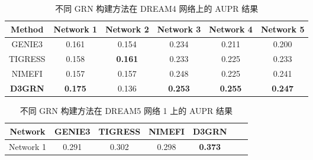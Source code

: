 \begin{table}[!htbp]
  \centering
  \begin{threeparttable}  
  \caption{不同 GRN 构建方法在 DREAM4 网络上的 AUPR 结果}

  \label{tab:performance_dr4} 
    \begin{tabular}{cccccc}  
    \toprule  
    Method
     & Network 1&  Network 2&  Network 3&  Network 4 & Network 5\\
    \midrule  
    GENIE3  &0.161   &0.154           &0.234      &0.211          &0.200                 \\
    TIGRESS &0.158   &\textbf{0.161}           &0.233      &0.225          &0.233                \\
    NIMEFI  &0.157   &0.157           &0.248      &0.225          &0.241                \\
    \textbf{D3GRN}   &\textbf{0.175}  &0.136      &\textbf{0.253} &\textbf{0.255}       &\textbf{0.247}  \\
    \bottomrule  
    \end{tabular}  
   \end{threeparttable}
\end{table} 

\begin{table}[!htbp]
  \centering  
  \begin{threeparttable}  
  \caption{不同 GRN 构建方法在 DREAM5 网络 1 上的 AUPR 结果}

  \label{tab:performance_dr5} 
    \begin{tabular}{ccccccc}  
    \toprule  
    Network&GENIE3 &TIGRESS &NIMEFI  &\textbf{D3GRN}\\
    \midrule  
    Network 1&0.291 &0.302 &0.298 &\textbf{0.373}\\
    \bottomrule  
    \end{tabular}  
    \end{threeparttable}
\end{table} 


